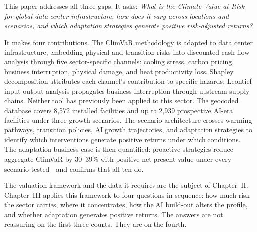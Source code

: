 \begin{twocolbody}

\noindent This paper addresses all three gaps. It asks: \textit{What is the Climate Value at Risk for global data center infrastructure, how does it vary across locations and scenarios, and which adaptation strategies generate positive risk-adjusted returns?}

It makes four contributions. The ClimVaR methodology \citep{epelbaum2025} is adapted to data center infrastructure, embedding physical and transition risks into discounted cash flow analysis through five sector-specific channels: cooling stress, carbon pricing, business interruption, physical damage, and heat productivity loss. Shapley decomposition \citep{shapley1953} attributes each channel's contribution to specific hazards; Leontief input-output analysis \citep{miller2009inputoutput} propagates business interruption through upstream supply chains. Neither tool has previously been applied to this sector. The geocoded database covers 8{,}572 installed facilities and up to 2{,}939 prospective AI-era facilities under three growth scenarios. The scenario architecture crosses warming pathways, transition policies, AI growth trajectories, and adaptation strategies to identify which interventions generate positive returns under which conditions. The adaptation business case is then quantified: proactive strategies reduce aggregate ClimVaR by 30--39\% with positive net present value under every scenario tested---and confirms that all ten do.

\vspace{3mm}

\noindent The valuation framework and the data it requires are the subject of Chapter~II. Chapter~III applies this framework to four questions in sequence: how much risk the sector carries, where it concentrates, how the AI build-out alters the profile, and whether adaptation generates positive returns. The answers are not reassuring on the first three counts. They are on the fourth.

\end{twocolbody}